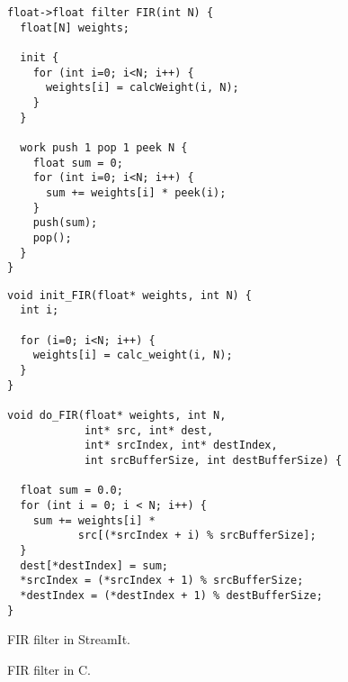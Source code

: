 \begin{figure}[t]

\begin{minipage}{0.45\textwidth}
\centering
\ninepoint
\begin{verbatim}
float->float filter FIR(int N) {
  float[N] weights;

  init {
    for (int i=0; i<N; i++) {
      weights[i] = calcWeight(i, N);
    }
  }

  work push 1 pop 1 peek N {
    float sum = 0;
    for (int i=0; i<N; i++) {
      sum += weights[i] * peek(i);
    }
    push(sum);
    pop();
  }
}
\end{verbatim}
\end{minipage}
\begin{minipage}{0.55\textwidth}
\centering
\ninepoint
\begin{verbatim}
void init_FIR(float* weights, int N) {
  int i;

  for (i=0; i<N; i++) {
    weights[i] = calc_weight(i, N);
  }
}

void do_FIR(float* weights, int N,
            int* src, int* dest, 
            int* srcIndex, int* destIndex,
            int srcBufferSize, int destBufferSize) {

  float sum = 0.0;
  for (int i = 0; i < N; i++) {
    sum += weights[i] * 
           src[(*srcIndex + i) % srcBufferSize];
  }
  dest[*destIndex] = sum;
  *srcIndex = (*srcIndex + 1) % srcBufferSize;
  *destIndex = (*destIndex + 1) % destBufferSize;
}
\end{verbatim}


\end{minipage}
\begin{minipage}{0.45\textwidth}
\centering
\caption{FIR filter in StreamIt.\protect\label{fig:fir-streamit}}
\end{minipage}
\begin{minipage}{0.55\textwidth}
\centering
\caption{FIR filter in C.\protect\label{fig:fir-c}}
\end{minipage}
\end{figure}

